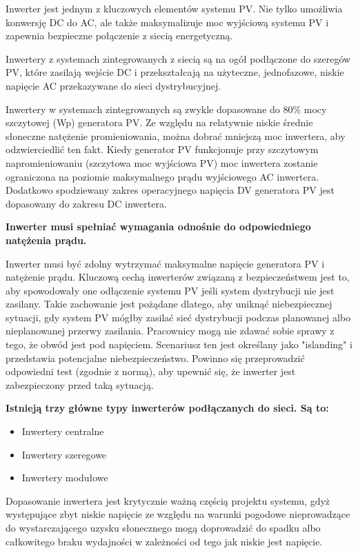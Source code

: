 \documentclass[12pt,a4paper]{article}
\begin{document}
Inwerter jest jednym z kluczowych elementów systemu PV. Nie tylko 
umożliwia konwersję DC do AC, ale także maksymalizuje moc wyjściową 
systemu PV i zapewnia bezpieczne połączenie z siecią energetyczną. 

Inwertery z systemach zintegrowanych z siecią są na ogół podłączone do 
szeregów PV, które zasilają wejście DC i przekształcają na użyteczne, 
jednofazowe, niskie napięcie AC przekazywane do sieci dystrybucyjnej. 

 

Inwertery w systemach zintegrowanych są zwykle dopasowane do 80\% mocy 
szczytowej (Wp) generatora PV. Ze względu na relatywnie niskie średnie 
słoneczne natężenie promieniowania, można dobrać mniejszą moc inwertera, 
aby odzwierciedlić ten fakt. Kiedy generator PV funkcjonuje przy 
szczytowym napromieniowaniu (szczytowa moc wyjściowa PV) moc inwertera 
zostanie ograniczona na poziomie maksymalnego prądu wyjściowego AC 
inwertera. Dodatkowo spodziewany zakres operacyjnego napięcia DV 
generatora PV jest dopasowany do zakresu DC inwertera. 

\textbf{Inwerter musi spełniać wymagania odnośnie do odpowiedniego 
natężenia prądu.}

Inwerter musi być zdolny wytrzymać maksymalne napięcie generatora PV i 
natężenie prądu. Kluczową cechą inwerterów związaną z bezpieczeństwem 
jest to, aby spowodowały one odłączenie systemu PV jeśli system 
dystrybucji nie jest zasilany. Takie zachowanie jest pożądane dlatego, 
aby uniknąć niebezpiecznej sytuacji, gdy system PV mógłby zasilać sieć 
dystrybucji podczas planowanej albo nieplanowanej przerwy zasilania. 
Pracownicy mogą nie zdawać sobie sprawy z tego, że obwód jest pod 
napięciem. Scenariusz ten jest określany jako "islanding" i 
przedstawia potencjalne niebezpieczeństwo. Powinno się przeprowadzić 
odpowiedni test (zgodnie z normą), aby upewnić się, że inwerter jest 
zabezpieczony przed taką sytuacją. 

 

\textbf{Istnieją trzy główne typy inwerterów podłączanych do sieci. Są 
to: }

\begin{itemize}
\item Inwertery centralne 
\item Inwertery szeregowe 
\item Inwertery modułowe 
\end{itemize}
Dopasowanie inwertera jest krytycznie ważną częścią projektu systemu, 
gdyż występujące zbyt niskie napięcie ze względu na warunki pogodowe 
nieprowadzące do wystarczającego uzysku słonecznego mogą doprowadzić do 
spadku albo całkowitego braku wydajności w zależności od tego jak niskie 
jest napięcie. 
\end{document}
